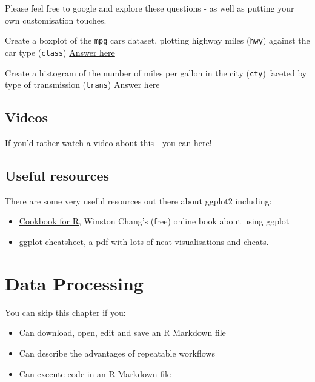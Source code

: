 \documentclass[
]{book}
\begin{document}
Please feel free to google and explore these questions - as well as putting your own customisation touches.

Create a boxplot of the \texttt{mpg} cars dataset, plotting highway miles (\texttt{hwy}) against the car type (\texttt{class})
\protect\hyperlink{gg_answers}{Answer here}

Create a histogram of the number of miles per gallon in the city (\texttt{cty}) faceted by type of transmission (\texttt{trans})
\protect\hyperlink{gg_answers}{Answer here}

\hypertarget{gg_vids}{%
\section{Videos}\label{gg_vids}}

If you'd rather watch a video about this - \href{https://media.ed.ac.uk/media/R+ConversationsA+Demystifying+ggplot/0_sct50ue1}{you can here!}

\hypertarget{gg_resources}{%
\section{Useful resources}\label{gg_resources}}

There are some very useful resources out there about ggplot2 including:

\begin{itemize}
\item
  \href{http://www.cookbook-r.com/Graphs/}{Cookbook for R}, Winston Chang's (free) online book about using ggplot
\item
  \href{https://rstudio.com/wp-content/uploads/2015/03/ggplot2-cheatsheet.pdf}{ggplot cheatsheet}, a pdf with lots of neat visualisations and cheats.
\end{itemize}

\hypertarget{dataprocessing}{%
\chapter{Data Processing}\label{dataprocessing}}

\begin{los}
You can skip this chapter if you:

\begin{itemize}
\item
  Can download, open, edit and save an R Markdown file
\item
  Can describe the advantages of repeatable workflows
\item
  Can execute code in an R Markdown file
\end{itemize}
\end{los}
\end{document}
